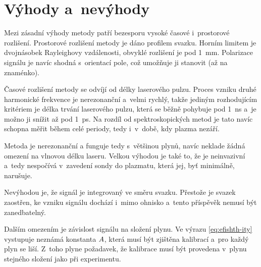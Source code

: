 \section{Výhody a~nevýhody}
\label{sec:efishth-proscons}
Mezi zásadní výhody metody \EFISH{} patří bezesporu vysoké časové
i~prostorové rozlišení.
Prostorové rozlišení metody je dáno profilem svazku.
Horním limitem je dvojnásobek Rayleighovy vzdálenosti,
obvyklé rozlišení je pod \SI{1}{\milli\metre}.
Polarizace signálu je navíc shodná s~orientací pole,
což umožňuje ji stanovit (až na znaménko).

Časové rozlišení metody se odvíjí od délky laserového pulzu.
Proces vzniku druhé harmonické frekvence je nerezonanční a~velmi rychlý,
takže jediným rozhodujícím kritériem je délka trvání laserového pulzu,
která se běžně pohybuje pod \SI{1}{\nano\second} a~je možno ji snížit
až pod \SI{1}{\pico\second}.
\autocite{efish-lecture}
Na rozdíl od spektroskopických metod je tato navíc schopna měřit
během celé periody, tedy i~v~době, kdy plazma nezáří.

Metoda je nerezonanční a funguje tedy s~většinou plynů,
navíc neklade žádná omezení na vlnovou délku laseru.
Velkou výhodou je také to, že je neinvazivní a~tedy nespočívá
v~zavedení sondy do plazmatu, která jej, byť minimálně, narušuje.

Nevýhodou \EFISH{} je, že signál je integrovaný ve směru svazku.
Přestože je svazek zaostřen, ke vzniku signálu dochází i~mimo ohnisko
a~tento příspěvěk nemusí být zanedbatelný.
\autocite{efish-lecture}

Dalším omezením je závislost signálu na složení plynu.
Ve výrazu \eqref{eq:efishth-ity} vystupuje neznámá konstanta $A$,
která musí být zjištěna kalibrací a~pro každý plyn se liší.
Z~toho plyne požadavek, že kalibrace musí být provedena v~plynu
stejného složení jako při experimentu.
\autocite{efish-lecture}
